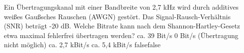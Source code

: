     {Ein Übertragungskanal mit einer Bandbreite von 2,7 kHz wird durch additives weißes Gaußsches Rauschen (AWGN) gestört. Das Signal-Rausch-Verhältnis (SNR) beträgt -20 dB. Welche Bitrate kann nach dem Shannon-Hartley-Gesetz etwa maximal fehlerfrei übertragen werden?}
    {ca. 39 Bit/s}
    {0 Bit/s (Übertragung nicht möglich)}
    {ca. 2,7 kBit/s}
    {ca. 5,4 kBit/s}
    {false}{false}